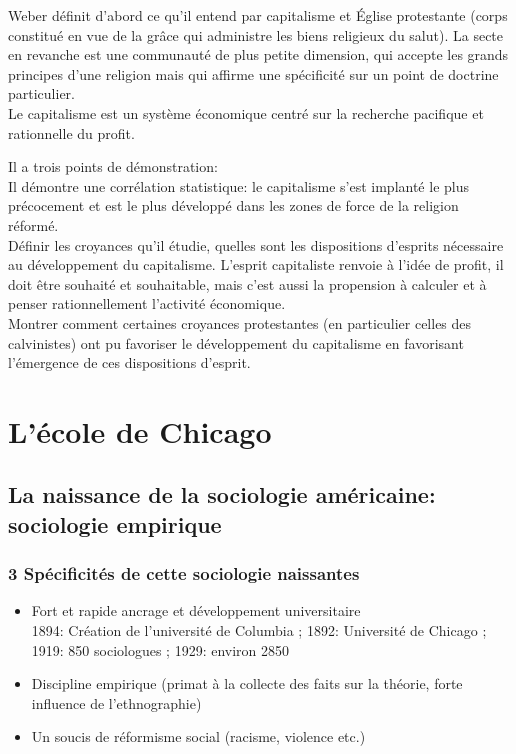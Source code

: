 \documentclass[10pt, a4paper, openany]{book}
\begin{document}
Weber définit d'abord ce qu'il entend par capitalisme et Église protestante (corps constitué en vue de la grâce qui administre les biens religieux du salut). La secte en revanche est une communauté de plus petite dimension, qui accepte les grands principes d'une religion mais qui affirme une spécificité sur un point de doctrine particulier. \\
Le capitalisme est un système économique centré sur la recherche pacifique et rationnelle du profit.

Il a trois points de démonstration: \\
Il démontre une corrélation statistique: le capitalisme s'est implanté le plus précocement et est le plus développé dans les zones de force de la religion réformé. \\
Définir les croyances qu'il étudie, quelles sont les dispositions d'esprits nécessaire au développement du capitalisme. L'esprit capitaliste renvoie à l'idée de profit, il doit être souhaité et souhaitable, mais c'est aussi la propension à calculer et à penser rationnellement l'activité économique. \\
Montrer comment certaines croyances protestantes (en particulier celles des calvinistes) ont pu favoriser le développement du capitalisme en favorisant l'émergence de ces dispositions d'esprit.

\chapter{L'école de Chicago}
\section{La naissance de la sociologie américaine: sociologie empirique}

\subsection{3 Spécificités de cette sociologie naissantes}

\begin{itemize}
\item Fort et rapide ancrage et développement universitaire \\
1894: Création de l'université de Columbia ; 1892: Université de Chicago ; 1919: 850 sociologues ; 1929: environ 2850
\item Discipline empirique (primat à la collecte des faits sur la théorie, forte influence de l'ethnographie)
\item Un soucis de réformisme social (racisme, violence etc.)
\end{itemize}
\end{document}
